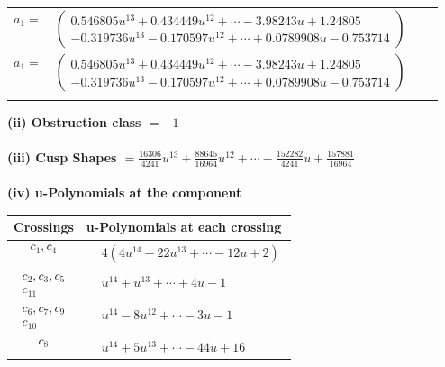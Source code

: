 \documentclass[1p]{elsarticle_modified}
\theoremstyle{definition}
\begin{document}
\begin{tabular}{m{7pt} m{180pt} m{7pt} m{180pt} }
\flushright $a_{1}=$&$\begin{pmatrix}0.546805 u^{13}+0.434449 u^{12}+\cdots-3.98243 u+1.24805\\-0.319736 u^{13}-0.170597 u^{12}+\cdots+0.0789908 u-0.753714\end{pmatrix}$\\ \flushright $a_{1}=$&$\begin{pmatrix}0.546805 u^{13}+0.434449 u^{12}+\cdots-3.98243 u+1.24805\\-0.319736 u^{13}-0.170597 u^{12}+\cdots+0.0789908 u-0.753714\end{pmatrix}$\\&\end{tabular}
\flushleft \textbf{(ii) Obstruction class $= -1$}\\~\\
\flushleft \textbf{(iii) Cusp Shapes $= \frac{16306}{4241} u^{13}+\frac{88645}{16964} u^{12}+\cdots-\frac{152282}{4241} u+\frac{157881}{16964}$}\\~\\
\newpage\renewcommand{\arraystretch}{1}
\flushleft \textbf{(iv) u-Polynomials at the component}\newline \\
\begin{tabular}{m{50pt}|m{274pt}}
Crossings & \hspace{64pt}u-Polynomials at each crossing \\
\hline $$\begin{aligned}c_{1},c_{4}\end{aligned}$$&$\begin{aligned}
&4(4 u^{14}-22 u^{13}+\cdots-12 u+2)
\end{aligned}$\\
\hline $$\begin{aligned}c_{2},c_{3},c_{5}\\c_{11}\end{aligned}$$&$\begin{aligned}
&u^{14}+u^{13}+\cdots+4 u-1
\end{aligned}$\\
\hline $$\begin{aligned}c_{6},c_{7},c_{9}\\c_{10}\end{aligned}$$&$\begin{aligned}
&u^{14}-8 u^{12}+\cdots-3 u-1
\end{aligned}$\\
\hline $$\begin{aligned}c_{8}\end{aligned}$$&$\begin{aligned}
&u^{14}+5 u^{13}+\cdots-44 u+16
\end{aligned}$\\
\hline
\end{tabular}\\~\\
\end{document}
